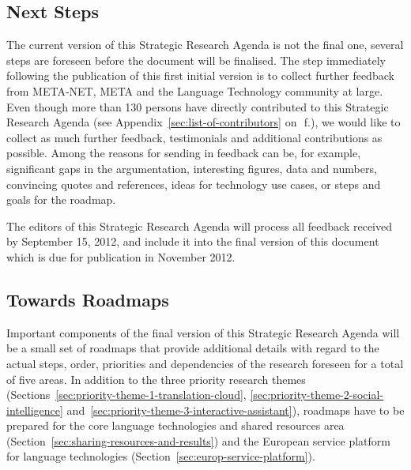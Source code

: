 \documentclass[10pt, plain]{../../metanetpaper}
\begin{document}

\clearpage

\label{sec:conclusions}

\begin{multicols}{2}
\subsection{Next Steps}
\label{sec:next-steps}

The current version of this Strategic Research Agenda is not the final one, several steps are foreseen before the document will be finalised. The step immediately following the publication of this first initial version is to collect further feedback from META-NET, META and the Language Technology community at large. Even though more than 130 persons have directly contributed to this Strategic Research Agenda (see Appendix~\ref{sec:list-of-contributors} on~\pageref{sec:list-of-contributors}\,f.), we would like to collect as much further feedback, testimonials and additional contributions as possible. Among the reasons for sending in feedback can be, for example, significant gaps in the argumentation, interesting figures, data and numbers, convincing quotes and references, ideas for technology use cases, or steps and goals for the roadmap.

\medskip
\centerline{}

\medskip
The editors of this Strategic Research Agenda will process all feedback received by September 15, 2012, and include it into the final version of this document which is due for publication in November 2012.

\subsection{Towards Roadmaps}
\label{sec:roadmaps}

Important components of the final version of this Strategic Research Agenda will be a small set of roadmaps that provide additional details with regard to the actual steps, order, priorities and dependencies of the research foreseen for a total of five areas. In addition to the three priority research themes (Sections~\ref{sec:priority-theme-1-translation-cloud}, \ref{sec:priority-theme-2-social-intelligence} and~\ref{sec:priority-theme-3-interactive-assistant}), roadmaps have to be prepared for the core language technologies and shared resources area (Section~\ref{sec:sharing-resources-and-results}) and the European service platform for language technologies (Section~\ref{sec:europ-service-platform}).


\end{multicols}
\end{document}
